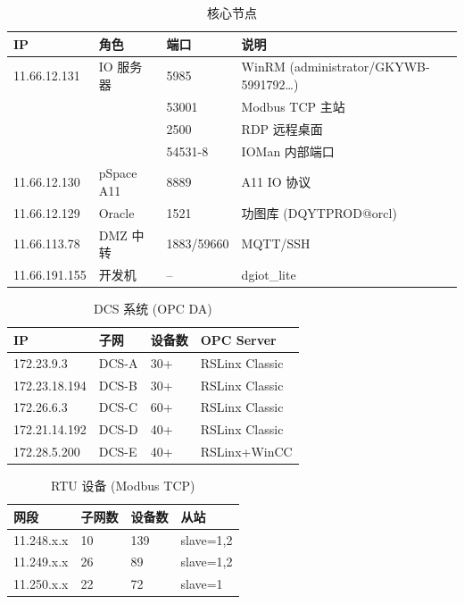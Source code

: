 \documentclass[12pt,a4paper]{ctexart}
\begin{document}
\begin{table}[H]\centering
\caption{核心节点}
\begin{tabular}{p{3cm}p{3.5cm}p{2cm}p{4.5cm}}
\toprule
\textbf{IP} & \textbf{角色} & \textbf{端口} & \textbf{说明} \\
\midrule
11.66.12.131 & IO 服务器 & 5985 & WinRM (administrator/GKYWB-5991792\ldots) \\
 & & 53001 & Modbus TCP 主站 \\
 & & 2500 & RDP 远程桌面 \\
 & & 54531-8 & IOMan 内部端口 \\
11.66.12.130 & pSpace A11 & 8889 & A11 IO 协议 \\
11.66.12.129 & Oracle & 1521 & 功图库 (DQYTPROD@orcl) \\
11.66.113.78 & DMZ 中转 & 1883/59660 & MQTT/SSH \\
11.66.191.155 & 开发机 & -- & dgiot\_lite \\
\bottomrule
\end{tabular}
\end{table}

\begin{table}[H]\centering
\caption{DCS 系统 (OPC DA)}
\begin{tabular}{p{3cm}p{3cm}p{2.5cm}p{3.5cm}}
\toprule
\textbf{IP} & \textbf{子网} & \textbf{设备数} & \textbf{OPC Server} \\
\midrule
172.23.9.3 & DCS-A & 30+ & RSLinx Classic \\
172.23.18.194 & DCS-B & 30+ & RSLinx Classic \\
172.26.6.3 & DCS-C & 60+ & RSLinx Classic \\
172.21.14.192 & DCS-D & 40+ & RSLinx Classic \\
172.28.5.200 & DCS-E & 40+ & RSLinx+WinCC \\
\bottomrule
\end{tabular}
\end{table}

\begin{table}[H]\centering
\caption{RTU 设备 (Modbus TCP)}
\begin{tabular}{p{3cm}p{2cm}p{2.5cm}p{4cm}}
\toprule
\textbf{网段} & \textbf{子网数} & \textbf{设备数} & \textbf{从站} \\
\midrule
11.248.x.x & 10 & 139 & slave=1,2 \\
11.249.x.x & 26 & 89 & slave=1,2 \\
11.250.x.x & 22 & 72 & slave=1 \\
\bottomrule
\end{tabular}
\end{table}
\end{document}
